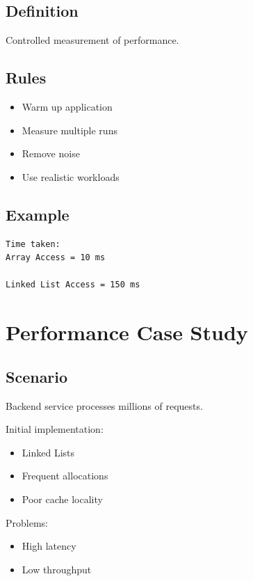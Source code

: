 \subsection{Definition}

Controlled measurement of performance.

\subsection{Rules}

\begin{itemize}
\item Warm up application
\item Measure multiple runs
\item Remove noise
\item Use realistic workloads
\end{itemize}

\subsection{Example}

\begin{verbatim}
Time taken:
Array Access = 10 ms

Linked List Access = 150 ms
\end{verbatim}

\section{Performance Case Study}

\subsection{Scenario}

Backend service processes millions of requests.

Initial implementation:

\begin{itemize}
\item Linked Lists
\item Frequent allocations
\item Poor cache locality
\end{itemize}

Problems:

\begin{itemize}
\item High latency
\item Low throughput
\end{itemize}


